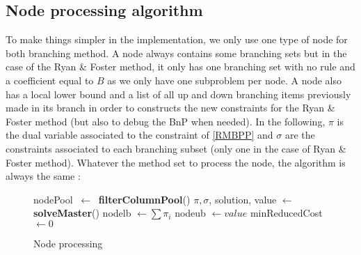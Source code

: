 \subsection{Node processing algorithm}
\label{node-process}

To make things simpler in the implementation, we only use one type of node for both branching method. A node always contains some branching sets but in the case of the Ryan \& Foster method, it only has one branching set with no rule and a coefficient equal to $B$ as we only have one subproblem per node. A node also has a local lower bound and a list of all up and down branching items previously made in its branch in order to constructs the new constraints for the Ryan \& Foster method (but also to debug the BnP when needed). In the following, $\pi$ is the dual variable associated to the constraint of \eqref{RMBPP} and $\sigma$ are the constraints associated to each branching subset (only one in the case of Ryan \& Foster method). Whatever the method set to process the node, the algorithm is always the same :
\begin{figure}[!ht]
	\centering
	\begin{minipage}[t]{0.7\linewidth}
		\begin{algorithm}[H]
			\DontPrintSemicolon 
			nodePool $\ \leftarrow \ $ \textbf{filterColumnPool}()\;
			$\pi, \sigma$, solution, value $ \leftarrow$ \textbf{solveMaster}()\;
			nodelb $\leftarrow \sum \pi_i$\; 
			nodeub $\leftarrow value$\; minReducedCost $\leftarrow 0$\;
			
			\caption{Node processing}
		\end{algorithm}
	\end{minipage}
\end{figure}
\newpage

